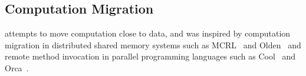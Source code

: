 \subsection{Computation Migration}

\cphash{} attempts to move computation close to data, and was inspired by 
computation migration in distributed shared memory systems such as MCRL~\cite{hsieh:sc} and
Olden~\cite{olden} and remote method invocation in parallel programming languages such as 
Cool~\cite{COOL} and Orca~\cite{orca:tocs}.

